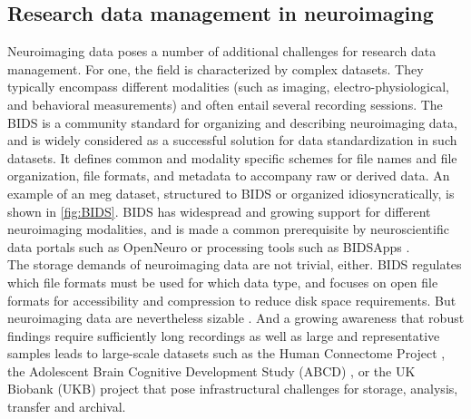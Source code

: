 \subsection{Research data management in neuroimaging}
\label{chap:k1-rdm-2}



Neuroimaging data poses a number of additional challenges for research data management.
For one, the field is characterized by complex datasets.
They typically encompass different modalities (such as imaging, electro-physiological, and behavioral measurements) and often entail several recording sessions.
The \gls{BIDS} \citep{gorgolewski2016brain} is a community standard for organizing and describing neuroimaging data, and is widely considered as a successful solution for data standardization in such datasets.
It defines common and modality specific schemes for file names and file organization, file formats, and metadata to accompany raw or derived data.
An example of an \gls{meg} dataset, structured to \gls{BIDS} or organized idiosyncratically, is shown in \cref{fig:BIDS}.
\gls{BIDS} has widespread and growing support for different neuroimaging modalities, and is made a common prerequisite by neuroscientific data portals such as OpenNeuro \citep{markiewicz2021openneuro} or processing tools such as BIDSApps \citep{gorgolewski2017bids}.\\
The storage demands of neuroimaging data are not trivial, either.
\gls{BIDS} regulates which file formats must be used for which data type, and focuses on open file formats for accessibility and compression to reduce disk space requirements.
But neuroimaging data are nevertheless sizable \citep{van2014human}.
And a growing awareness that robust findings require sufficiently long recordings \citep{li2021moving} as well as large and representative samples \citep{button2013power, turner2018small} leads to large-scale datasets such as the Human Connectome Project \citep{van2013wu}, the Adolescent Brain Cognitive Development Study (ABCD) \citep{casey2018adolescent}, or the UK Biobank (UKB) project \citep{matthews2015uk} that pose infrastructural challenges for storage, analysis, transfer and archival.
